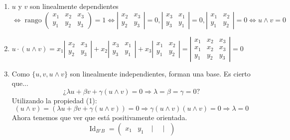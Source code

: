\documentclass[12pt, a4paper, ones, notitlepage, openany,titlepage]{article}
\begin{document}
\begin{enumerate}
	\item $u$ y $v$ son linealmente dependientes $\Longleftrightarrow \operatorname{rango} \left(
	\begin{matrix}
		x_1 & x_2 & x_3 \\
		y_1 & y_2 & y_3
	\end{matrix}
	\right) = 1 \Longleftrightarrow \left|
	\begin{matrix}
		x_2 & x_3 \\
		y_2 & y_3
	\end{matrix}
	\right| = 0, \left|
	\begin{matrix}
		x_3 & x_1 \\
		y_3 & y_1
	\end{matrix}
	\right| = 0, \left|
	\begin{matrix}
		x_1 & x_2 \\
		y_1 & y_2
	\end{matrix}
	\right| = 0 \Longleftrightarrow u \wedge v = 0$
	\item $u \cdot (u \wedge v) = x_1 \left|
	\begin{matrix}
		x_2 & x_3 \\
		y_2 & y_3
	\end{matrix}
	\right| + x_2 \left|
	\begin{matrix}
		x_3 & x_1 \\
		y_3 & y_1
	\end{matrix}
	\right| + x_3 \left|
	\begin{matrix}
		x_1 & x_2 \\
		y_1 & y_2
	\end{matrix}
	\right| = \left| \begin{matrix}
		x_1 & x_2 & x_3 \\
		x_1 & x_2 & x_3 \\
		y_1 & y_2 & y_3
	\end{matrix}
	\right| = 0$
	\item Como $\{u,v,u \wedge v\}$ son linealmente independientes, forman una base. Es cierto que...
	$$
	\text{¿} \lambda u + \beta v + \gamma (u \wedge v) = 0 \Longrightarrow \lambda = \beta = \gamma = 0 \text{?}
	$$
	Utilizando la propiedad (1):
	$$
	(u \wedge v) = (\lambda u + \beta v + \gamma (u \wedge v)) = 0 \Longrightarrow \gamma (u \wedge v)(u \wedge v) = 0 \Longrightarrow \lambda = 0
	$$
	Ahora tenemos que ver que está positivamente orientada.
	$$
	\operatorname{Id}_{B'B} =
	\begin{pmatrix}
		x_1 & y_1 & \begin{vmatrix}

\end{vmatrix}
\end{pmatrix}$$
\end{enumerate}
\end{document}
